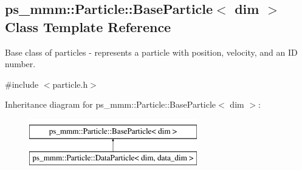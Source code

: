\hypertarget{classps__mmm_1_1_particle_1_1_base_particle}{}\subsection{ps\+\_\+mmm\+:\+:Particle\+:\+:Base\+Particle$<$ dim $>$ Class Template Reference}
\label{classps__mmm_1_1_particle_1_1_base_particle}


Base class of particles -\/ represents a particle with position, velocity, and an I\+D number.  




{\ttfamily \#include $<$particle.\+h$>$}

Inheritance diagram for ps\+\_\+mmm\+:\+:Particle\+:\+:Base\+Particle$<$ dim $>$\+:\begin{figure}[H]
\begin{center}
\leavevmode
\includegraphics[height=2.000000cm]{classps__mmm_1_1_particle_1_1_base_particle}
\end{center}
\end{figure}
